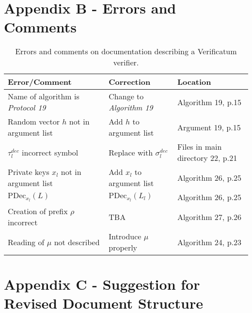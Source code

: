 \clearpage
\section{Appendix B - Errors and Comments}

\begin{table}[h!]
\begin{tabular}{| p{3.5cm} | p{3.5cm} | p{3.5cm} |}
  \hline \bf{Error/Comment} & \bf{Correction} & \bf{Location} \\ \hline \hline

 Name of algorithm is
  \emph{Protocol 19} & Change to \emph{Algorithm 19} & Algorithm 19,
  p.15 \\ \hline

  Random vector $h$ not in argument list & Add $h$ to argument list &
  Argument 19, p.15 \\ \hline

  $\tau_l^{dec}$ incorrect symbol & Replace with $\sigma_l^{dec}$ &
  Files in main directory 22, p.21 \\ \hline

  Private keys $x_l$ not in argument list & Add $x_l$ to
  argument list & Algorithm 26, p.25 \\ \hline

  $\mathrm{PDec}_{x_l}(L)$ & $\mathrm{PDec}_{x_l}(L_l)$ & Algorithm
  26, p.25 \\ \hline

  Creation of prefix $\rho$ incorrect & TBA & Algorithm 27, p.26
  \\ \hline

  Reading of $\mu$ not described & Introduce $\mu$ properly & Algorithm 24, p.23 \\ \hline

\end{tabular}
\caption{Errors and comments on documentation describing a Verificatum verifier.}

\end{table}

\clearpage
\section{Appendix C - Suggestion for Revised Document Structure}

